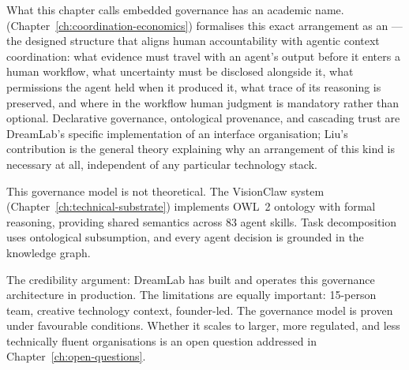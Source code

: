 What this chapter calls embedded governance has an academic name. \textcite{Liu2026} (Chapter~\ref{ch:coordination-economics}) formalises this exact arrangement as an  --- the designed structure that aligns human accountability with agentic context coordination: what evidence must travel with an agent's output before it enters a human workflow, what uncertainty must be disclosed alongside it, what permissions the agent held when it produced it, what trace of its reasoning is preserved, and where in the workflow human judgment is mandatory rather than optional. Declarative governance, ontological provenance, and cascading trust are DreamLab's specific implementation of an interface organisation; Liu's contribution is the general theory explaining why an arrangement of this kind is necessary at all, independent of any particular technology stack.

\begin{keyinsight}[title={The VisionClaw Evidence}]
This governance model is not theoretical. The VisionClaw system (Chapter~\ref{ch:technical-substrate}) implements OWL~2 ontology with formal reasoning, providing shared semantics across 83 agent skills. Task decomposition uses ontological subsumption, and every agent decision is grounded in the knowledge graph.

The credibility argument: DreamLab has built and operates this governance architecture in production. The limitations are equally important: 15-person team, creative technology context, founder-led. The governance model is proven under favourable conditions. Whether it scales to larger, more regulated, and less technically fluent organisations is an open question addressed in Chapter~\ref{ch:open-questions}.
\end{keyinsight}
